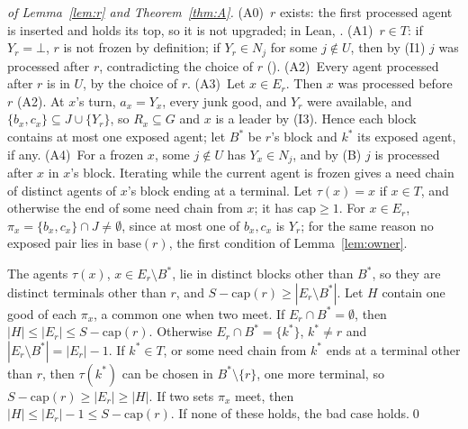 \documentclass[runningheads,11pt]{llncs}
\newcommand{\capa}{\mathrm{cap}}
\newcommand{\base}{\mathrm{base}}
\newcommand{\none}{\bot}
\begin{document}
\begin{proof}[of Lemma~\ref{lem:r} and Theorem~\ref{thm:A}]
(A0)~$r$ exists: the first processed agent is inserted and holds its top, so it is not upgraded; in Lean, .
(A1)~$r\in T$: if $Y_r=\none$, $r$ is not frozen by definition; if $Y_r\in N_j$ for some $j\notin U$, then by (I1) $j$ was processed after $r$, contradicting the choice of $r$ ().
(A2)~Every agent processed after $r$ is in $U$, by the choice of $r$.
(A3)~Let $x\in E_r$. Then $x$ was processed before $r$ (A2). At $x$'s turn, $a_x=Y_x$, every junk good, and $Y_r$ were available, and $\{b_x,c_x\}\subseteq J\cup\{Y_r\}$, so $R_x\subseteq G$ and $x$ is a leader by (I3). Hence each block contains at most one exposed agent; let $B^*$ be $r$'s block and $k^*$ its exposed agent, if any.
(A4)~For a frozen $x$, some $j\notin U$ has $Y_x\in N_j$, and by (B) $j$ is processed after $x$ in $x$'s block. Iterating while the current agent is frozen gives a need chain of distinct agents of $x$'s block ending at a terminal. Let $\tau(x)=x$ if $x\in T$, and otherwise the end of some need chain from $x$; it has $\capa\ge1$.
For $x\in E_r$, $\pi_x=\{b_x,c_x\}\cap J\ne\emptyset$, since at most one of $b_x,c_x$ is $Y_r$; for the same reason no exposed pair lies in $\base(r)$, the first condition of Lemma~\ref{lem:owner}.

The agents $\tau(x)$, $x\in E_r\setminus B^*$, lie in distinct blocks other than $B^*$, so they are distinct terminals other than $r$, and $S-\capa(r)\ge|E_r\setminus B^*|$. Let $H$ contain one good of each $\pi_x$, a common one when two meet. If $E_r\cap B^*=\emptyset$, then $|H|\le|E_r|\le S-\capa(r)$. Otherwise $E_r\cap B^*=\{k^*\}$, $k^*\ne r$ and $|E_r\setminus B^*|=|E_r|-1$. If $k^*\in T$, or some need chain from $k^*$ ends at a terminal other than $r$, then $\tau(k^*)$ can be chosen in $B^*\setminus\{r\}$, one more terminal, so $S-\capa(r)\ge|E_r|\ge|H|$. If two sets $\pi_x$ meet, then $|H|\le|E_r|-1\le S-\capa(r)$. If none of these holds, the bad case holds.\qed
\end{proof}
\end{document}
